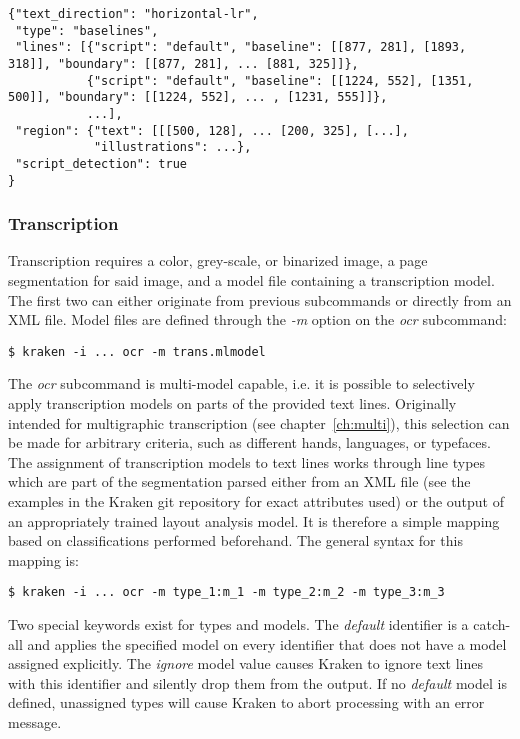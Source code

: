 \begin{verbatim}
{"text_direction": "horizontal-lr",
 "type": "baselines",
 "lines": [{"script": "default", "baseline": [[877, 281], [1893, 318]], "boundary": [[877, 281], ... [881, 325]]},
           {"script": "default", "baseline": [[1224, 552], [1351, 500]], "boundary": [[1224, 552], ... , [1231, 555]]},
           ...],
 "region": {"text": [[[500, 128], ... [200, 325], [...],
            "illustrations": ...},
 "script_detection": true
}
\end{verbatim}

\subsubsection{Transcription}

Transcription requires a color, grey-scale, or binarized image, a page
segmentation for said image, and a model file containing a transcription model.
The first two can either originate from previous subcommands or directly from
an XML file. Model files are defined through the \emph{-m} option on the
\emph{ocr} subcommand:

\begin{verbatim}
$ kraken -i ... ocr -m trans.mlmodel
\end{verbatim}

The \emph{ocr} subcommand is multi-model capable, i.e. it is possible to
selectively apply transcription models on parts of the provided text lines.
Originally intended for multigraphic transcription (see
chapter~\ref{ch:multi}), this selection can be made for arbitrary criteria,
such as different hands, languages, or typefaces. The assignment of
transcription models to text lines works through line types which are part of
the segmentation parsed either from an XML file (see the examples in the Kraken
git repository for exact attributes used) or the output of an appropriately
trained layout analysis model. It is therefore a simple mapping based on
classifications performed beforehand. The general syntax for this mapping is:

\begin{verbatim}
$ kraken -i ... ocr -m type_1:m_1 -m type_2:m_2 -m type_3:m_3
\end{verbatim}

Two special keywords exist for types and models. The \emph{default}
identifier is a catch-all and applies the specified model on every identifier
that does not have a model assigned explicitly. The \emph{ignore} model value
causes Kraken to ignore text lines with this identifier and silently drop them
from the output. If no \emph{default} model is defined, unassigned types will
cause Kraken to abort processing with an error message.

